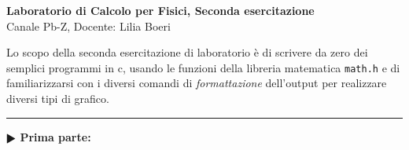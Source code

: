 \documentclass[11pt]{article}
\begin{document}
\pagestyle{empty}

\begin{center}
{\Large \bf  Laboratorio di Calcolo per Fisici, Seconda esercitazione\\[2mm]}
{\large Canale Pb-Z, Docente: Lilia Boeri}
\end{center}
\vspace{1mm}

\begin{mdframed}[backgroundcolor=panna]
  Lo scopo della seconda esercitazione di laboratorio \`e di
  scrivere da zero dei semplici programmi in c, usando le funzioni
  della libreria matematica \texttt{math.h} e di familiarizzarsi con i diversi
  comandi di {\em formattazione\/} dell'output per realizzare diversi
  tipi di grafico.
  \end{mdframed}
%
%
\hrule
\vspace{1mm}
\textbf{$\RHD$ Prima parte:} 
\end{document}
